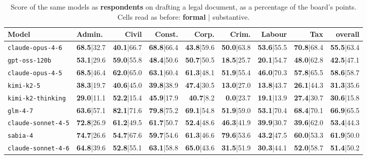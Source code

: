 \documentclass{IOS-Book-Article}
\begin{document}
\begin{table}[!ht]
\centering
\caption{Score of the same models as \textbf{respondents} on drafting a legal document, as a percentage of the board's points. Cells read as before: \textbf{formal} | substantive.}
\footnotesize\setlength{\tabcolsep}{2pt}
\begin{tabular}{llrrrrrrr}
\hline
\textbf{Model} & \textbf{Admin.} & \textbf{Civil} & \textbf{Const.} & \textbf{Corp.} & \textbf{Crim.} & \textbf{Labour} & \textbf{Tax} & \textbf{overall} \\
\hline
\texttt{claude-opus-4-6} & \textbf{68.5}|32.7 & \textbf{40.1}|66.7 & \textbf{68.8}|66.4 & \textbf{43.8}|59.6 & \textbf{50.0}|63.8 & \textbf{53.6}|55.5 & \textbf{70.8}|68.4 & \textbf{55.5}|63.4 \\
\texttt{gpt-oss-120b} & \textbf{53.1}|29.6 & \textbf{59.0}|55.8 & \textbf{48.4}|50.6 & \textbf{50.7}|50.5 & \textbf{18.5}|25.7 & \textbf{20.1}|54.7 & \textbf{48.0}|62.8 & \textbf{42.5}|47.1 \\
\texttt{claude-opus-4-5} & \textbf{68.5}|46.4 & \textbf{62.0}|65.0 & \textbf{63.1}|60.4 & \textbf{61.3}|48.1 & \textbf{51.9}|55.4 & \textbf{46.0}|70.3 & \textbf{57.8}|65.5 & \textbf{58.6}|58.7 \\
\texttt{kimi-k2-5} & \textbf{38.3}|19.7 & \textbf{40.6}|45.0 & \textbf{39.8}|38.9 & \textbf{47.4}|30.5 & \textbf{13.0}|27.0 & \textbf{13.8}|43.7 & \textbf{26.1}|44.3 & \textbf{31.3}|35.6 \\
\texttt{kimi-k2-thinking} & \textbf{29.0}|11.1 & \textbf{52.2}|15.4 & \textbf{45.9}|17.9 & \textbf{40.7}|8.2 & \textbf{0.0}|23.7 & \textbf{19.1}|13.9 & \textbf{27.4}|30.7 & \textbf{30.6}|15.8 \\
\texttt{glm-4-7} & \textbf{63.6}|57.1 & \textbf{82.1}|71.6 & \textbf{79.8}|75.2 & \textbf{69.1}|54.8 & \textbf{51.9}|59.0 & \textbf{53.1}|70.4 & \textbf{68.4}|70.1 & \textbf{66.9}|65.5 \\
\texttt{claude-sonnet-4-5} & \textbf{72.8}|26.9 & \textbf{61.2}|49.5 & \textbf{61.7}|50.7 & \textbf{52.4}|48.6 & \textbf{46.3}|41.9 & \textbf{39.9}|30.7 & \textbf{39.6}|62.0 & \textbf{53.4}|44.3 \\
\texttt{sabia-4} & \textbf{74.7}|26.6 & \textbf{54.7}|67.6 & \textbf{59.7}|54.6 & \textbf{61.3}|46.6 & \textbf{79.6}|53.6 & \textbf{43.2}|47.5 & \textbf{60.0}|53.3 & \textbf{61.9}|50.0 \\
\texttt{claude-sonnet-4-6} & \textbf{64.8}|39.6 & \textbf{52.8}|55.1 & \textbf{63.1}|58.8 & \textbf{65.0}|43.6 & \textbf{31.5}|51.9 & \textbf{30.3}|44.1 & \textbf{52.0}|58.7 & \textbf{51.4}|50.2 \\

\end{tabular}
\end{table}
\end{document}

